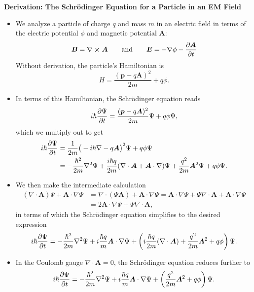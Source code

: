 \documentclass[11pt, a4paper]{article}
\renewcommand{\div}{\nabla \cdot}
\renewcommand{\curl}{\nabla \cross}
\renewcommand{\grad}{\nabla}
\renewcommand{\laplacian}{\nabla^{2}}
\newcommand{\eqtext}[1]{\qquad \text{#1} \qquad}
\newcommand{\Schro}{Schr\"{o}dinger\xspace}
\newcommand{\Ham}{Hamiltonian\xspace}
\renewcommand{\vec}[1]{\bm{#1}}  %
\newcommand{\A}{\vec{A}}  %
\renewcommand{\P}{\Psi}  %
\begin{document}
\textbf{Derivation: The \Schro Equation for a Particle in an EM Field}
\begin{itemize}
	\item We analyze a particle of charge $ q $ and mass $ m $ in an electric field in terms of the electric potential $ \phi $ and magnetic potential $ \A $:
	\begin{equation*}
		\vec{B} = \curl \A \eqtext{and} \vec{E} = - \grad \phi - \pdv{\A}{t}
	\end{equation*}
    Without derivation, the particle's Hamiltonian is
	\begin{equation*}
		H = \frac{(\vec{p} - q\A)^{2}}{2m} + q \phi.
	\end{equation*}
	
	\item In terms of this \Ham, the \Schro equation reads
	\begin{equation*}
		i \hbar \pdv{\P}{t} = \frac{(\vec{p} - q\A)^{2}}{2m}\P + q \phi\P,
    \end{equation*}
    which we multiply out to get
    \begin{align*}
        i \hbar \pdv{\P}{t} &= \frac{1}{2m}\big(-i\hbar \grad - q\A\big)^{2}\P + q\phi \P\\
    & = -\frac{\hbar^{2}}{2m}\laplacian \P + \frac{i \hbar q}{2m}(\div \A + \A \cdot \grad)\P + \frac{q^{2}}{2m}\A^{2}\P + q \phi \P.
    \end{align*}
	
    \item We then make the intermediate calculation
	\begin{align*}
		(\div \A) \P + \A \cdot \grad \P & = \div (\P \A) + \A \cdot \grad \P = \A \cdot \grad \P + \P \div \A + \A \cdot \grad \P \\
		& = 2\A \cdot \grad \P + \P \div \A,
	\end{align*}
    in terms of which the \Schro equation simplifies to the desired expression
	\begin{equation*}
		i \hbar \pdv{\P}{t} = -\frac{\hbar^{2}}{2m}\laplacian \P + i \frac{\hbar q}{m}\A \cdot \grad \P + \left(i\frac{\hbar q}{2m}(\div \A) + \frac{q^{2}}{2m}\A^{2} + q\phi\right)\P.
	\end{equation*}
	
    \item In the Coulomb gauge $ \div \A = 0 $, the \Schro equation reduces further to
	\begin{equation*}
		i \hbar \pdv{\P}{t} = -\frac{\hbar^{2}}{2m}\laplacian \P + i \frac{\hbar q}{m}\A \cdot \grad \P + \left(\frac{q^{2}}{2m}\A^{2} + q\phi\right)\P.
	\end{equation*}
\end{itemize}
\end{document}
